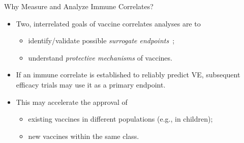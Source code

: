 \documentclass{beamer}
\begin{document}

\begin{frame}[c]{Why Measure and Analyze Immune Correlates?}

\begin{center}
\begin{itemize}
  \itemsep8pt
  \item Two, interrelated goals of vaccine correlates analyses are to
    \begin{itemize}
      \itemsep0pt
      \item identify/validate possible \textit{surrogate
        endpoints}~\citep{prentice1989surrogate};
      \item understand \textit{protective mechanisms} of vaccines.
    \end{itemize}
  \item If an immune correlate is established to reliably predict VE,
    subsequent efficacy trials may use it as a primary endpoint.
  \item This may accelerate the approval of
    \begin{itemize}
      \itemsep0pt
      \item existing vaccines in different populations (e.g., in children);
      \item new vaccines within the same class.
    \end{itemize}
\end{itemize}
\end{center}

\note{
}

\end{frame}

\end{document}
